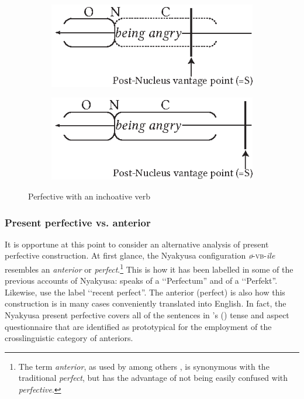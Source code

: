 \begin{figure} 
\begin{center}
\begin{subfigure}[h]{0.47\textwidth}
\includegraphics{figures/GrafikInchoativeStative.eps}
\end{subfigure}
\begin{subfigure}[h]{0.47\textwidth}
\includegraphics{figures/GrafikInchoativeChangeOfState.eps}
\end{subfigure}
\caption{Perfective with an inchoative verb}
\label{FigurePerfectiveInchoative}
\end{center}
\end{figure}

 \newpage 
\subsubsection{Present perfective vs. anterior}\label{PRSPFVvsAnterior}
It is opportune at this point to consider an alternative analysis of present perfective construction. At first glance, the Nyakyusa configuration \textit{ø}-\textsc{vb}-\textit{ile} resembles an \textit{anterior} or \textit{perfect}.\footnote{The term \textit{anterior}, as used by among others \citet{BybeePerkinsPaglucia1994}, is synonymous with the traditional \textit{perfect}, but has the advantage of not being easily confused with \textit{perfective}.} This is how it has been labelled in some of the previous accounts of Nyakyusa: \citet{SchumannK1899} speaks of a \lq\lq Perfectum'' and \citet{EndemannC1914} of a \lq\lq Perfekt''. Likewise, \citet{MwangokaNVoorhoeveJ1960b} use the label \lq\lq recent perfect''. The anterior (perfect) is also how this construction is in many cases conveniently translated into English. In fact, the Nyakyusa present perfective covers all of the sentences in \citeauthor{DahlOe1985}'s (\citeyear{DahlOe1985}) tense and aspect questionnaire that are identified as prototypical for the employment of the crosslinguistic category of anteriors.

